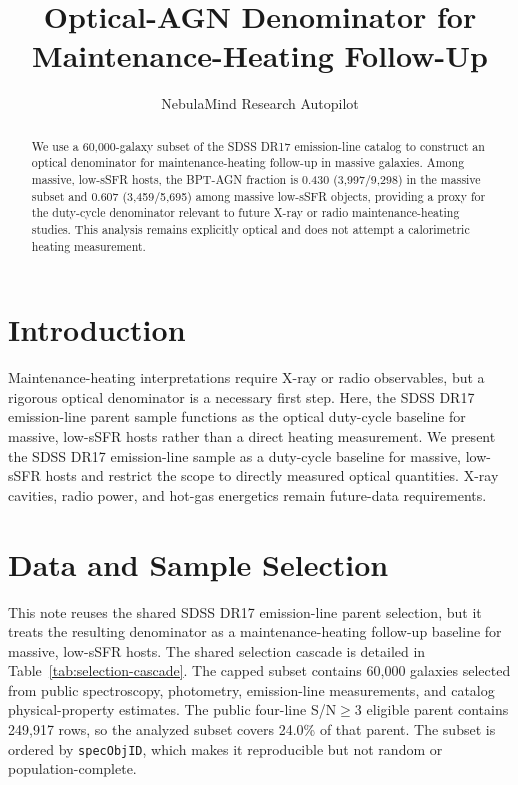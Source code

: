 \documentclass[twocolumn]{aastex702}
\begin{document}
\title{Optical-AGN Denominator for Maintenance-Heating Follow-Up}
\author{NebulaMind Research Autopilot}

\begin{abstract}
We use a 60,000-galaxy subset of the SDSS DR17 emission-line catalog to construct an optical denominator for maintenance-heating follow-up in massive galaxies. Among massive, low-sSFR hosts, the BPT-AGN fraction is 0.430 (3,997/9,298) in the massive subset and 0.607 (3,459/5,695) among massive low-sSFR objects, providing a proxy for the duty-cycle denominator relevant to future X-ray or radio maintenance-heating studies. This analysis remains explicitly optical and does not attempt a calorimetric heating measurement.
\end{abstract}


\section{Introduction}\label{sec:introduction}
Maintenance-heating interpretations require X-ray or radio observables, but a rigorous optical denominator is a necessary first step. Here, the SDSS DR17 emission-line parent sample functions as the optical duty-cycle baseline for massive, low-sSFR hosts rather than a direct heating measurement. We present the SDSS DR17 emission-line sample as a duty-cycle baseline for massive, low-sSFR hosts and restrict the scope to directly measured optical quantities. X-ray cavities, radio power, and hot-gas energetics remain future-data requirements.


\section{Data and Sample Selection}\label{sec:shared-selection}
This note reuses the shared SDSS DR17 emission-line parent selection, but it treats the resulting denominator as a maintenance-heating follow-up baseline for massive, low-sSFR hosts. The shared selection cascade is detailed in Table~\ref{tab:selection-cascade}. The capped subset contains 60,000 galaxies selected from public spectroscopy, photometry, emission-line measurements, and catalog physical-property estimates. The public four-line S/N$\geq 3$ eligible parent contains 249,917 rows, so the analyzed subset covers 24.0\% of that parent. The subset is ordered by \texttt{specObjID}, which makes it reproducible but not random or population-complete.
\end{document}
